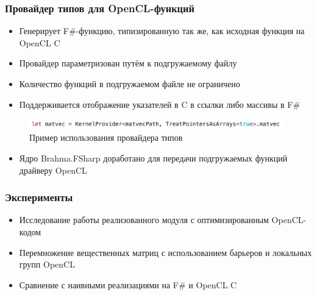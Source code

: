 \documentclass{beamer}
\begin{document}
\begin{frame}
  \transwipe[direction=90]
  \frametitle{Провайдер типов для OpenCL-функций}
  \begin{itemize}
    \item Генерирует F\#-функцию, типизированную так же, как исходная функция на OpenCL C
    \item Провайдер параметризован путём к подгружаемому файлу
    \item Количество функций в подгружаемом файле не ограничено
    \item Поддерживается отображение указателей в C в ссылки либо массивы в F\#
  \end{itemize}

  \begin{figure}[t]
      \centering
      \includegraphics[width=11cm]{pictures/tp-call.png}
      \caption{Пример использования провайдера типов}
  \end{figure}

  \begin{itemize}
    \item Ядро Brahma.FSharp доработано для передачи подгружаемых функций драйверу OpenCL
  \end{itemize}
\end{frame}

\begin{frame}[t]
  \transwipe[direction=90]
  \frametitle{Эксперименты}
  \begin{itemize}
    \item Исследование работы реализованного модуля с оптимизированным OpenCL-кодом
    \item Перемножение вещественных матриц с использованием барьеров и локальных групп OpenCL
  \end{itemize}
  \begin{itemize}
    \item Сравнение с наивными реализациями на F\# и OpenCL C
  \end{itemize}
\end{frame}
\end{document}
